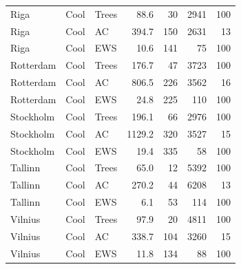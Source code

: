 \begin{table}[ht]
\begin{tabular}{lllrrrr}
  Riga & Cool & Trees & 88.6 & 30 & 2941 & 100 \\ 
  Riga & Cool & AC & 394.7 & 150 & 2631 & 13 \\ 
  Riga & Cool & EWS & 10.6 & 141 & 75 & 100 \\ 
  Rotterdam & Cool & Trees & 176.7 & 47 & 3723 & 100 \\ 
  Rotterdam & Cool & AC & 806.5 & 226 & 3562 & 16 \\ 
  Rotterdam & Cool & EWS & 24.8 & 225 & 110 & 100 \\ 
  Stockholm & Cool & Trees & 196.1 & 66 & 2976 & 100 \\ 
  Stockholm & Cool & AC & 1129.2 & 320 & 3527 & 15 \\ 
  Stockholm & Cool & EWS & 19.4 & 335 & 58 & 100 \\ 
  Tallinn & Cool & Trees & 65.0 & 12 & 5392 & 100 \\ 
  Tallinn & Cool & AC & 270.2 & 44 & 6208 & 13 \\ 
  Tallinn & Cool & EWS & 6.1 & 53 & 114 & 100 \\ 
  Vilnius & Cool & Trees & 97.9 & 20 & 4811 & 100 \\ 
  Vilnius & Cool & AC & 338.7 & 104 & 3260 & 15 \\ 
  Vilnius & Cool & EWS & 11.8 & 134 & 88 & 100 \\ 
   \bottomrule
\end{tabular}
\end{table}
